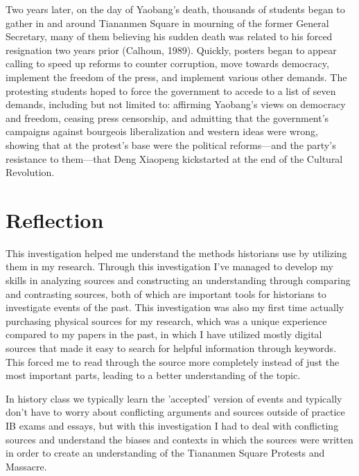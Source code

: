 \documentclass{paper}
\begin{document}
\begin{doublespace}
Two years later, on the day of Yaobang's death, thousands of students began to gather in and around Tiananmen Square in mourning of the former General Secretary, many of them believing his sudden death was related to his forced resignation two years prior (Calhoun, 1989). Quickly, posters began to appear calling to speed up reforms to counter corruption, move towards democracy, implement the freedom of the press, and implement various other demands. The protesting students hoped to force the government to accede to a list of seven demands, including but not limited to: affirming Yaobang's views on democracy and freedom, ceasing press censorship, and admitting that the government's campaigns against bourgeois liberalization and western ideas were wrong, showing that at the protest's base were the political reforms---and the party's resistance to them---that Deng Xiaopeng kickstarted at the end of the Cultural Revolution.
\end{doublespace}

\newpage

\section{Reflection}
\begin{doublespace}
This investigation helped me understand the methods historians use by utilizing them in my research. Through this investigation I've managed to develop my skills in analyzing sources and constructing an understanding through comparing and contrasting sources, both of which are important tools for historians to investigate events of the past. This investigation was also my first time actually purchasing physical sources for my research, which was a unique experience compared to my papers in the past, in which I have utilized mostly digital sources that made it easy to search for helpful information through keywords. This forced me to read through the source more completely instead of just the most important parts, leading to a better understanding of the topic.

In history class we typically learn the 'accepted' version of events and typically don't have to worry about conflicting arguments and sources outside of practice IB exams and essays, but with this investigation I had to deal with conflicting sources and understand the biases and contexts in which the sources were written in order to create an understanding of the Tiananmen Square Protests and Massacre.
\end{doublespace}
\end{document}
